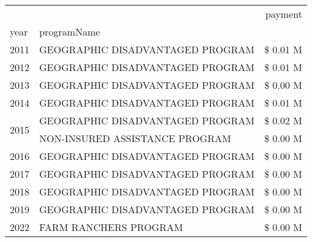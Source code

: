 \begin{tabular}{llr}
\toprule
 &  & payment \\
year & programName &  \\
\midrule
2011 & GEOGRAPHIC DISADVANTAGED PROGRAM & \$ 0.01 M \\
\cline{1-3}
2012 & GEOGRAPHIC DISADVANTAGED PROGRAM & \$ 0.01 M \\
\cline{1-3}
2013 & GEOGRAPHIC DISADVANTAGED PROGRAM & \$ 0.00 M \\
\cline{1-3}
2014 & GEOGRAPHIC DISADVANTAGED PROGRAM & \$ 0.01 M \\
\cline{1-3}
\multirow[t]{2}{*}{2015} & GEOGRAPHIC DISADVANTAGED PROGRAM & \$ 0.02 M \\
 & NON-INSURED ASSISTANCE PROGRAM & \$ 0.00 M \\
\cline{1-3}
2016 & GEOGRAPHIC DISADVANTAGED PROGRAM & \$ 0.00 M \\
\cline{1-3}
2017 & GEOGRAPHIC DISADVANTAGED PROGRAM & \$ 0.00 M \\
\cline{1-3}
2018 & GEOGRAPHIC DISADVANTAGED PROGRAM & \$ 0.00 M \\
\cline{1-3}
2019 & GEOGRAPHIC DISADVANTAGED PROGRAM & \$ 0.00 M \\
\cline{1-3}
2022 & FARM RANCHERS PROGRAM & \$ 0.00 M \\
\cline{1-3}
\bottomrule
\end{tabular}
